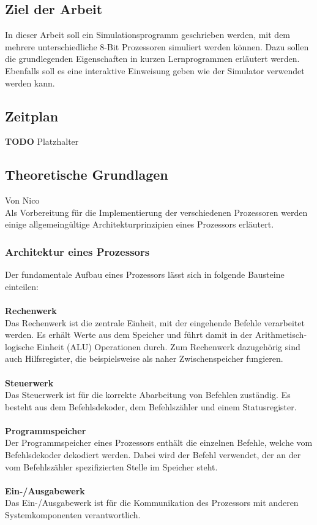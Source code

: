 \documentclass[12pt]{article}
\newcommand{\todo}{\textbf{TODO}}
\begin{document}
\subsection{Ziel der Arbeit}
In dieser Arbeit soll ein Simulationsprogramm geschrieben werden, mit dem mehrere unterschiedliche 8-Bit Prozessoren simuliert werden können. Dazu sollen die grundlegenden Eigenschaften in kurzen Lernprogrammen erläutert werden. Ebenfalls soll es eine interaktive Einweisung geben wie der Simulator verwendet werden kann.

\subsection{Zeitplan}
\todo
Platzhalter

\newpage

\subsection{Theoretische Grundlagen}
Von Nico\\

\noindent
Als Vorbereitung für die Implementierung der verschiedenen Prozessoren werden einige allgemeingültige Architekturprinzipien eines Prozessors erläutert. 

\subsubsection{Architektur eines Prozessors}
Der fundamentale Aufbau eines Prozessors lässt sich in folgende Bausteine einteilen:\\ \\
\textbf{Rechenwerk}\\
Das Rechenwerk ist die zentrale Einheit, mit der eingehende Befehle verarbeitet werden. Es erhält Werte aus dem Speicher und führt damit in der Arithmetisch-logische Einheit (ALU) Operationen durch. Zum Rechenwerk dazugehörig sind auch Hilfsregister, die beispielsweise als naher Zwischenspeicher fungieren.\\ \\
\textbf{Steuerwerk}\\
Das Steuerwerk ist für die korrekte Abarbeitung von Befehlen zuständig. Es besteht aus dem Befehlsdekoder, dem Befehlszähler und einem Statusregister.\\ \\
\textbf{Programmspeicher}\\
Der Programmspeicher eines Prozessors enthält die einzelnen Befehle, welche vom Befehlsdekoder dekodiert werden. Dabei wird der Befehl verwendet, der an der vom Befehlszähler spezifizierten Stelle im Speicher steht.\\ \\
\textbf{Ein-/Ausgabewerk}\\
Das Ein-/Ausgabewerk ist für die Kommunikation des Prozessors mit anderen Systemkomponenten verantwortlich.\\
\end{document}
